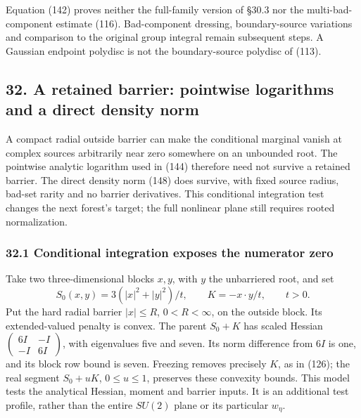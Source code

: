 \documentclass[11pt,a4paper]{article}
\begin{document}
Equation (142) proves neither the full-family version of §30.3 nor the
multi-bad-component estimate (116). Bad-component dressing,
boundary-source variations and comparison to the original group integral
remain subsequent steps. A Gaussian endpoint polydisc is not the
boundary-source polydisc of (113).

\hypertarget{a-retained-barrier-pointwise-logarithms-and-a-direct-density-norm}{%
\subsection{32. A retained barrier: pointwise logarithms and a direct
density
norm}\label{a-retained-barrier-pointwise-logarithms-and-a-direct-density-norm}}

A compact radial outside barrier can make the conditional marginal
vanish at complex sources arbitrarily near zero somewhere on an
unbounded root. The pointwise analytic logarithm used in (144) therefore
need not survive a retained barrier. The direct density norm (148) does
survive, with fixed source radius, bad-set rarity and no barrier
derivatives. This conditional integration test changes the next forest's
target; the full nonlinear plane still requires rooted normalization.

\hypertarget{conditional-integration-exposes-the-numerator-zero}{%
\subsubsection{32.1 Conditional integration exposes the numerator
zero}\label{conditional-integration-exposes-the-numerator-zero}}

Take two three-dimensional blocks \(x,y\), with \(y\) the unbarriered
root, and set
\[S_0(x,y)=3(|x|^2+|y|^2)/t,\qquad K=-x\cdot y/t,\qquad t>0.\] Put the
hard radial barrier \(|x|\le R\), \(0<R<\infty\), on the outside block.
Its extended-valued penalty is convex. The parent \(S_0+K\) has scaled
Hessian
\(\left(\begin{smallmatrix}6I&-I\\-I&6I\end{smallmatrix}\right)\), with
eigenvalues five and seven. Its norm difference from \(6I\) is one, and
its block row bound is seven. Freezing removes precisely \(K\), as in
(126); the real segment \(S_0+uK\), \(0\le u\le1\), preserves these
convexity bounds. This model tests the analytical Hessian, moment and
barrier inputs. It is an additional test profile, rather than the entire
\(SU(2)\) plane or its particular \(w_\eta\).
\end{document}
